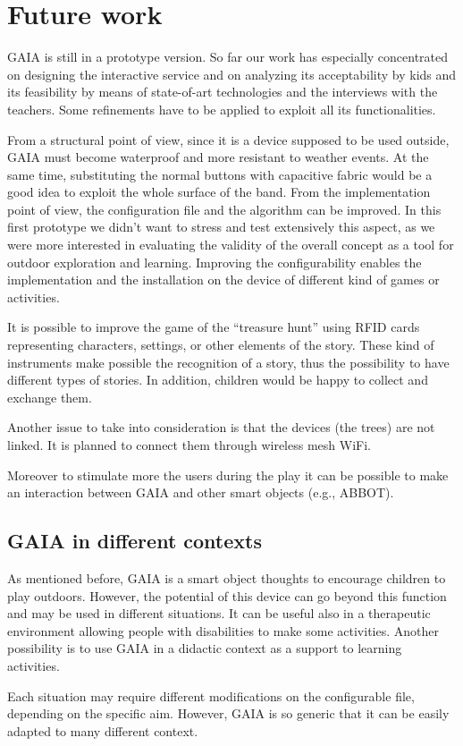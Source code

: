 \documentclass[a4paper,11pt]{report}
\begin{document}
\chapter{Future work}
GAIA is still in a prototype version. So far our work has especially concentrated on designing the interactive service and on analyzing its acceptability by kids and its feasibility by means of state-of-art technologies and the interviews with the teachers. Some refinements have to be applied to exploit all its functionalities.\par
From a structural point of view, since it is a device supposed to be used outside, GAIA must become waterproof and more resistant to weather events. At the same time, substituting the normal buttons with capacitive fabric would be a good idea to exploit the whole surface of the band. From the implementation point of view, the configuration file and the algorithm can be improved. In this first prototype we didn’t want to stress and test extensively this aspect, as we were more interested in evaluating the validity of the overall concept as a tool for outdoor exploration and learning. Improving the configurability enables the implementation and the installation on the device of different kind of games or activities.\par
It is possible to improve the game of the “treasure hunt” using RFID cards representing characters, settings, or other elements of the story. These kind of instruments make possible the recognition of a story, thus the possibility to have different types of stories. In addition, children would be happy to collect and exchange them.\par
Another issue to take into consideration is that the devices (the trees) are not linked. It is planned to connect them through wireless mesh WiFi.\par
Moreover to stimulate more the users during the play it can be possible to make an interaction between GAIA and other smart objects (e.g., ABBOT). 

\section{GAIA in different contexts}
As mentioned before, GAIA is a smart object thoughts to encourage children to play outdoors. However, the potential of this device can go beyond this function and may be used in different situations. It can be useful also in a therapeutic environment allowing people with disabilities to make some activities. Another possibility is to use GAIA in a didactic context as a support to learning activities.\par
Each situation may require different modifications on the configurable file, depending on the specific aim. However, GAIA is so generic that it can be easily adapted to many different context.
\end{document}
